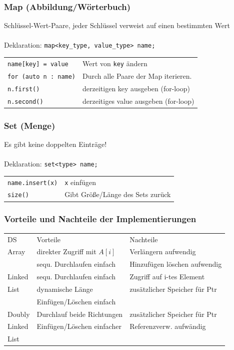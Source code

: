 \documentclass[fs, footer]{latex4ei}
\renewcommand{\t}{\texttt}
\begin{document}
\begin{multicols*}{4}
{{\subsubsection{Map (Abbildung/Wörterbuch)}
Schlüssel-Wert-Paare, jeder Schlüssel verweist auf einen bestimmten Wert\\ \\
Deklaration: \t{map<key\_type, value\_type> name;}\\
\begin{tabular}{ll}
\t{name[key] = value}& Wert von \t{key} ändern\\
\t{for (auto n : name)}& Durch alle Paare der Map iterieren.\\
\t{n.first()}& derzeitigen key ausgeben (for-loop)\\
\t{n.second()}& derzeitiges value ausgeben (for-loop)\\

\end{tabular}

\subsubsection{Set (Menge)}
Es gibt keine doppelten Einträge!\\ \\
Deklaration: \t{set<type> name;}\\
\begin{tabular}{ll}
\t{name.insert(x)}& \t{x} einfügen\\
\t{size()}& Gibt Größe/Länge des Sets zurück\\

\end{tabular}


\subsubsection{Vorteile und Nachteile der Implementierungen}
\begin{tabular}{l|l|l}
DS & Vorteile & Nachteile \\
\brule
Array & direkter Zugriff mit $A[i]$ & Verlängern aufwendig \\
 & sequ. Durchlaufen einfach & Hinzufügen löschen aufwendig \\
\brule
Linked & sequ. Durchlaufen einfach & Zugriff auf i-tes Element\\
List & dynamische Länge & zusätzlicher Speicher für Ptr\\
 & Einfügen/Löschen einfach & \\
\brule
Doubly & Durchlauf beide Richtungen & zusätzlicher Speicher für Ptr\\
Linked & Einfügen/Löschen einfacher & Referenzverw. aufwändig\\
List & & \\
\end{tabular}

}}
\end{multicols*}
\end{document}
